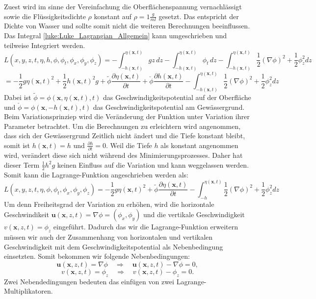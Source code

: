 Zuest wird im sinne der Vereinfachung die Oberflächenspannung vernachlässigt sowie die Flüssigkeitsdichte $\rho$ konstant auf $\rho = 1\frac{g}{ml}$ gesetzt.
Das entspricht der Dichte von Wasser und sollte somit nicht die weiteren Berechnungen beeinflussen.
Das Integral \eqref{luke:Luke_Lagrangian_Allgemein} kann umgeschrieben und teilweise Integriert werden.
\[
L(x,y,z,t,\eta,h,\phi,\phi_t,\phi_x, \phi_y, \phi_z)
=
-\int_{-h(\bm{x},t)}^{\eta(\bm{x},t)} g z\, dz - \int_{-h(\bm{x},t)}^{\eta(\bm{x},t)} \phi_t\, dz -\int_{-h(\bm{x},t)}^{\eta(\bm{x},t)} \frac{1}{2}\left(\nabla\phi\right)^2 + \frac{1}{2}\phi_z^2 dz
\]
\[
=
-\frac{1}{2}g\eta(\bm{x},t)^2 + \frac{1}{2}h(\bm{x},t)^2g +\tilde{\phi} \frac{\partial\eta(\bm{x},t)}{\partial t} + \check{\phi} \frac{\partial h(\bm{x},t)}{\partial t} -\int_{-h(\bm{x},t)}^{\eta(\bm{x},t)} \frac{1}{2}\left(\nabla\phi\right)^2 + \frac{1}{2}\phi_z^2 dz
\]
Dabei ist $\tilde{\phi} = \phi(\bm{x},\eta(\bm{x},t),t)$ das Geschwindigkeitspotential auf der Oberfläche und $\check{\phi} = \phi(\bm{x},-h(\bm{x},t),t)$ das Geschwindigkeitspotential am Gewässergrund.
Beim Variationsprinziep wird die Veränderung der Funktion unter Variation ihrer Parameter betrachtet.
Um die Berechnungen zu erleichtern wird angenommen, dass sich der Gewässergrund Zeitlich nicht ändert und die Tiefe konstant bleibt, somit ist $h(\bm{x},t) = h$ und $\frac{\partial h}{\partial t} = 0$.
Weil die Tiefe $h$ als konstant angenommen wird, verändert diese sich nicht während des Minimierungsprozesses.
Daher hat dieser Term $\frac{1}{2}h^2g$ keinen Einfluss auf die Variation und kann weggelassen werden.
Somit kann die Lagrange-Funktion angeschrieben werden als:
\[
L(x,y,z,t,\eta,\phi,\phi_t,\phi_x, \phi_y, \phi_z)
=
-\frac{1}{2}g\eta(\bm{x},t)^2 +\tilde{\phi} \frac{\partial\eta(\bm{x},t)}{\partial t} -\int_{-h}^{\eta(\bm{x},t)} \frac{1}{2}\left(\nabla\phi\right)^2 + \frac{1}{2}\phi_z^2 dz
\]
Um denn Freiheitsgrad der Variation zu erhöhen, wird die horizontale Geschwindikeit $\bm{u}(\bm{x},z,t) = \nabla\phi = \left(\phi_x, \phi_y\right)$ und die vertikale Geschwindigkeit $v(\bm{x},z,t) = \phi_z$ eingeführt. 
Dadurch das wir die Lagrange-Funktion erweitern müssen wir auch der Zusammenhang von horizontalen und vertikalen Geschwindigkeit mit dem Geschwindigkeitspotential als Nebenbedingung einsetzten.
Somit bekommen wir folgende Nebenbedingungen:
\[
\bm{u}(\bm{x},z,t)
=
\nabla\phi
\quad\Rightarrow\quad
\bm{u}(\bm{x},z,t)
-
\nabla\phi
=
0,
\]
\[
v(\bm{x},z,t)
=
\phi_z
\quad\Rightarrow\quad
v(\bm{x},z,t)
-
\phi_z
=
0.
\]
Zwei Nebendedingungen bedeuten das einfügen von zwei Lagrange-Multiplikatoren.
